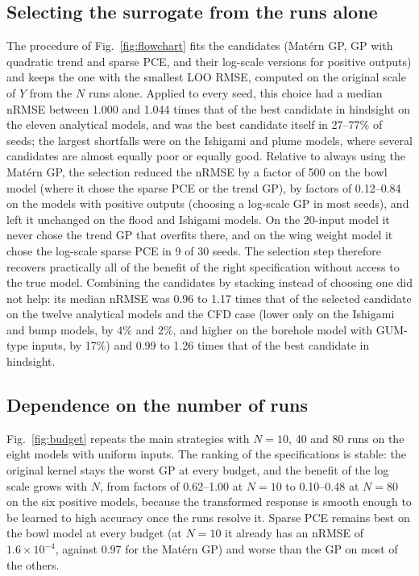 \subsection{Selecting the surrogate from the runs alone}
\label{sec:res-select}
The procedure of Fig.~\ref{fig:flowchart} fits the candidates (Mat\'ern GP,
GP with quadratic trend and sparse PCE, and their log-scale versions for
positive outputs) and keeps the one with the smallest LOO RMSE, computed on
the original scale of $Y$ from the $N$ runs alone. Applied to every seed,
this choice had a median nRMSE between 1.000 and 1.044 times that of the
best candidate in hindsight on the eleven analytical models, and was the best
candidate itself in 27--77\% of seeds; the largest shortfalls were on the
Ishigami and plume models, where several candidates are almost equally
poor or equally good. Relative to always using the Mat\'ern GP, the
selection reduced the nRMSE by a factor of 500 on the bowl model (where
it chose the sparse PCE or the trend GP), by factors of 0.12--0.84 on the
models with positive outputs (choosing a log-scale GP in most seeds), and
left it unchanged on the flood and Ishigami models. On the 20-input model it
never chose the trend GP that overfits there, and on the wing weight model
it chose the log-scale sparse PCE in 9 of 30 seeds. The selection step
therefore recovers practically all of the benefit of the right
specification without access to the true model. Combining the candidates
by stacking instead of choosing one did not help: its median nRMSE was
0.96 to 1.17 times that of the selected candidate on the twelve analytical
models and the CFD case (lower only on the Ishigami and bump models, by 4\% and 2\%, and
higher on the borehole model with GUM-type inputs, by 17\%) and 0.99 to
1.26 times that of the best candidate in hindsight.

\subsection{Dependence on the number of runs}
\label{sec:res-budget}
Fig.~\ref{fig:budget} repeats the main strategies with $N=10$, 40 and 80
runs on the eight models with uniform inputs. The ranking of the
specifications is stable: the original kernel stays the worst GP at every
budget, and the benefit of the log scale grows with $N$, from factors of
0.62--1.00 at $N=10$ to 0.10--0.48 at $N=80$ on the six positive models,
because the transformed response is smooth enough to be learned to high
accuracy once the runs resolve it. Sparse PCE remains best on the bowl
model at every budget (at $N=10$ it already has an nRMSE of
$1.6\times10^{-4}$, against 0.97 for the Mat\'ern GP) and worse than the GP
on most of the others.

